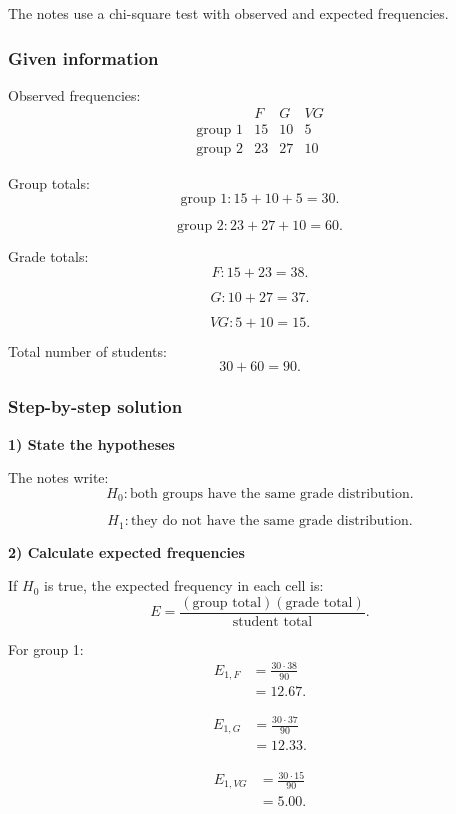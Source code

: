 \documentclass[10pt]{article}
\begin{document}
The notes use a chi-square test with observed and
expected frequencies.

\subsubsection*{Given information}

Observed frequencies:
\[
\begin{array}{c|ccc}
& F & G & VG\\
\hline
\text{group 1} & 15 & 10 & 5\\
\text{group 2} & 23 & 27 & 10
\end{array}
\]

Group totals:
\[
\text{group 1}: 15+10+5=30.
\]

\[
\text{group 2}: 23+27+10=60.
\]

Grade totals:
\[
F:15+23=38.
\]

\[
G:10+27=37.
\]

\[
VG:5+10=15.
\]

Total number of students:
\[
30+60=90.
\]

\subsubsection*{Step-by-step solution}

\textbf{1) State the hypotheses}

The notes write:
\[
H_0:
\text{both groups have the same grade distribution.}
\]

\[
H_1:
\text{they do not have the same grade distribution.}
\]

\textbf{2) Calculate expected frequencies}

If \(H_0\) is true, the expected frequency in each
cell is:
\[
E=
\frac{
(\text{group total})(\text{grade total})
}{
\text{student total}
}.
\]

For group 1:
\begin{align*}
E_{1,F}
&=
\frac{30\cdot 38}{90}
\\[2mm]
&=12.67.
\end{align*}

\begin{align*}
E_{1,G}
&=
\frac{30\cdot 37}{90}
\\[2mm]
&=12.33.
\end{align*}

\begin{align*}
E_{1,VG}
&=
\frac{30\cdot 15}{90}
\\[2mm]
&=5.00.
\end{align*}
\end{document}
